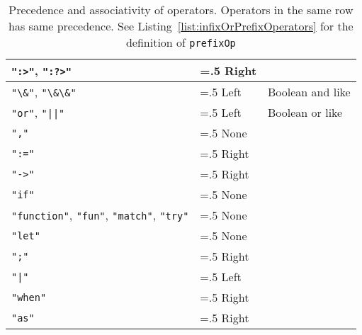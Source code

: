 \begin{table}
\begin{tabularx}{\linewidth}{|>{\hsize=1\hsize\raggedright\arraybackslash}X|>{\hsize=.5\hsize}X|>{\hsize=1.5\hsize}X|}
     \hline
    \mbox{\lstinline[language=ebnf]|":>"|,} \mbox{\lstinline[language=ebnf]|":?>"|} & Right & \\
     \hline
    \mbox{\lstinline[language=ebnf]|"\&"|,} \mbox{\lstinline[language=ebnf]|"\&\&"|} & Left & Boolean and like\\
     \hline
    \mbox{\lstinline[language=ebnf]|"or"|,} \mbox{\lstinline[language=ebnf]!"||"!} & Left & Boolean or like\\
     \hline
     \lstinline[language=ebnf]|","| & None & \\
     \hline
     \lstinline[language=ebnf]|":="| & Right & \\
     \hline
     \lstinline[language=ebnf]|"->"| & Right & \\
     \hline
    \lstinline[language=ebnf]|"if"| & None & \\
     \hline
    \mbox{\lstinline[language=ebnf]|"function"|,} \mbox{\lstinline[language=ebnf]|"fun"|,} \mbox{\lstinline[language=ebnf]|"match"|,} \mbox{\lstinline[language=ebnf]|"try"|}& None & \\
     \hline
     \lstinline[language=ebnf]|"let"| & None & \\
     \hline
     \lstinline[language=ebnf]|";"| & Right & \\
     \hline
     \lstinline[language=ebnf]!"|"! & Left & \\
     \hline
     \lstinline[language=ebnf]|"when"| & Right & \\
     \hline
     \lstinline[language=ebnf]|"as"| & Right & \\
     \hline
  \end{tabularx}
  \caption{Precedence and associativity of operators. Operators in the same row has same precedence. See Listing~\ref{list:infixOrPrefixOperators} for the definition of \lstinline!prefixOp!}
  \label{tab:operatorPrecedence}
\end{table}


